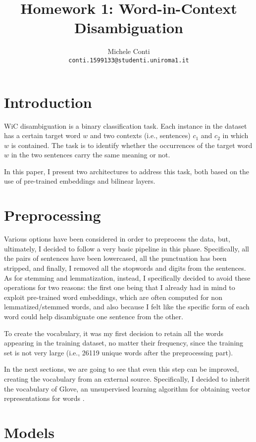 \documentclass[11pt,a4paper]{article}
\title{Homework 1: Word-in-Context Disambiguation}
\author{Michele Conti \\
	\texttt{conti.1599133@studenti.uniroma1.it}\\}
\date{}
\begin{document}
	\maketitle
	\section{Introduction}
	WiC disambiguation is a binary classification task. Each instance in the dataset has a certain target word $w$ and two contexts (i.e., sentences) $c_1$ and $c_2$ in which $w$ is contained. The task is to identify whether the occurrences of the target word $w$ in the two sentences carry the same meaning or not.
	
	In this paper, I present two architectures to address this task, both based on the use of pre-trained embeddings and bilinear layers.

	\section{Preprocessing}	
	Various options have been considered in order to preprocess the data, but, ultimately, I decided to follow a very basic pipeline in this phase. Specifically, all the pairs of sentences have been lowercased, all the punctuation has been stripped, and finally, I removed all the stopwords and digits from the sentences. As for stemming and lemmatization, instead, I specifically decided to avoid these operations for two reasons: the first one being that I already had in mind to exploit pre-trained word embeddings, which are often computed for non lemmatized/stemmed words, and also because I felt like the specific form of each word could help disambiguate one sentence from the other.
	
	To create the vocabulary, it was my first decision to retain all the words appearing in the training dataset, no matter their frequency, since the training set is not very large (i.e., 26119 unique words after the preprocessing part).
	
	In the next sections, we are going to see that even this step can be improved, creating the vocabulary from an external source. Specifically, I decided to inherit the vocabulary of Glove, an unsupervised learning algorithm for obtaining vector representations for words \citep{pennington2014glove}.

	\section{Models}
\end{document}
